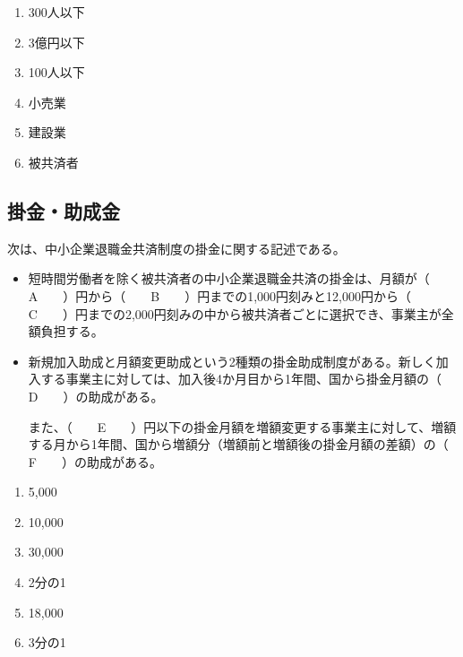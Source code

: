 \begin{answerbox}
  \begin{enumerate}[A:]
    \item 300人以下
    \item 3億円以下
    \item 100人以下
    \item 小売業
    \item 建設業
    \item 被共済者
  \end{enumerate}
\end{answerbox}

\newpage

\subsection{掛金・助成金}

\begin{fillblank}[数理人試験 2023 問題1 設問5]
  次は、中小企業退職金共済制度の掛金に関する記述である。

  \begin{itemize}
  \item 短時間労働者を除く被共済者の中小企業退職金共済の掛金は、月額が（　　A　　）円から（　　B　　）円までの1,000円刻みと12,000円から（　　C　　）円までの2,000円刻みの中から被共済者ごとに選択でき、事業主が全額負担する。

  \item 新規加入助成と月額変更助成という2種類の掛金助成制度がある。新しく加入する事業主に対しては、加入後4か月目から1年間、国から掛金月額の（　　D　　）の助成がある。

    また、（　　E　　）円以下の掛金月額を増額変更する事業主に対して、増額する月から1年間、国から増額分（増額前と増額後の掛金月額の差額）の（　　F　　）の助成がある。
\end{itemize}
  
\end{fillblank}

\begin{answerbox}
  \begin{enumerate}[A:]
    \item 5,000
    \item 10,000
    \item 30,000
    \item 2分の1
    \item 18,000
    \item 3分の1
  \end{enumerate}
\end{answerbox}


